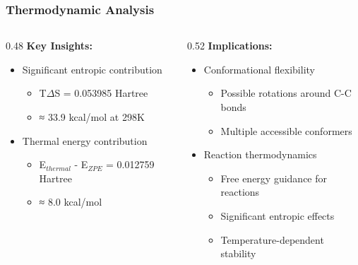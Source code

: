\documentclass[aspectratio=169, 9pt]{beamer}
\begin{document}
\begin{frame}
\frametitle{Thermodynamic Analysis}
\begin{columns}
\begin{column}{0.48\textwidth}
\textbf{Key Insights:}
\begin{itemize}
\item Significant entropic contribution 
  \begin{itemize}
  \item T$\Delta$S = 0.053985 Hartree
  \item ≈ 33.9 kcal/mol at 298K
  \end{itemize}
\item Thermal energy contribution
  \begin{itemize}
  \item E$_{thermal}$ - E$_{ZPE}$ = 0.012759 Hartree
  \item ≈ 8.0 kcal/mol
  \end{itemize}  
\end{itemize}
\end{column}
\begin{column}{0.52\textwidth}
\textbf{Implications:}
\begin{itemize}
\item Conformational flexibility
  \begin{itemize}
  \item Possible rotations around C-C bonds
  \item Multiple accessible conformers
  \end{itemize}
\item Reaction thermodynamics
  \begin{itemize}
  \item Free energy guidance for reactions
  \item Significant entropic effects
  \item Temperature-dependent stability
  \end{itemize}
\end{itemize}
\end{column}
\end{columns}
\end{frame}
\end{document}
